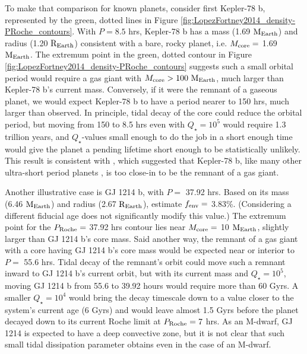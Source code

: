 \documentclass{svjour3}                     %
\begin{document}
To make that comparison for known planets, consider first Kepler-78 b, represented by the green, dotted lines in Figure \ref{fig:LopezFortney2014_density-PRoche_contours}. With $P = 8.5$ hrs, Kepler-78 b has a mass (1.69 ${\rm M_{Earth}}$) and radius (1.20 ${\rm R_{Earth}}$) consistent with a bare, rocky planet, i.e. $M_{\rm core} =$ 1.69 ${\rm M_{Earth}}$. The extremum point in the green, dotted contour in Figure \ref{fig:LopezFortney2014_density-PRoche_contours} suggests such a small orbital period would require a gas giant with $M_{\rm core} > 100\ {\rm M_{Earth}}$, much larger than Kepler-78 b's current mass. Conversely, if it were the remnant of a gaseous planet, we would expect Kepler-78 b to have a period nearer to 150 hrs, much larger than observed. In principle, tidal decay of the core could reduce the orbital period, but moving from 150 to 8.5 hrs even with $Q_\star = 10^5$ would require 1.3 trillion years, and $Q_\star$-values small enough to do the job in a short enough time would give the planet a pending lifetime short enough to be statistically unlikely. This result is consistent with \cite{2015ApJ...813..101V}, which suggested that Kepler-78 b, like many other ultra-short period planets \cite{2014ApJ...787...47S}, is too close-in to be the remnant of a gas giant.

Another illustrative case is GJ 1214 b, with $P =$ 37.92 hrs. Based on its mass (6.46 ${\rm M_{Earth}}$) and radius (2.67 ${\rm R_{Earth}}$), \cite{Lopez2014Understanding} estimate $f_{\rm env} =$ 3.83\%. (Considering a different fiducial age does not significantly modify this value.) The extremum point for the $P_{\rm Roche} =$ 37.92 hrs contour lies near $M_{\rm core} =$ 10 ${\rm M_{Earth}}$, slightly larger than GJ 1214 b's core mass. Said another way, the remnant of a gas giant with a core having GJ 1214 b's core mass would be expected near or interior to $P =$ 55.6 hrs. Tidal decay of the remnant's orbit could move such a remnant inward to GJ 1214 b's current orbit, but with its current mass and $Q_\star = 10^5$, moving GJ 1214 b from 55.6 to 39.92 hours would require more than 60 Gyrs. A smaller $Q_\star = 10^4$ would bring the decay timescale down to a value closer to the system's current age (6 Gyrs) and would leave almost 1.5 Gyrs before the planet decayed down to its current Roche limit at $P_{\rm Roche} = 7$ hrs. As an M-dwarf, GJ 1214 is expected to have a deep convective zone, but it is not clear that such small tidal dissipation parameter obtains even in the case of an M-dwarf.
\end{document}
